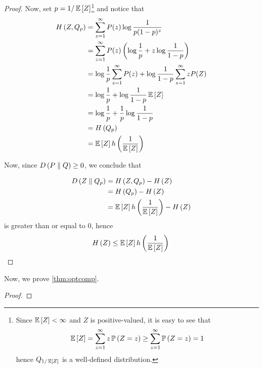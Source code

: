 \begin{proof}
    Now, set $p = \sfrac{1}{\expectation{Z}}$\footnote{
        Since $\expectation{Z} < \infty$ and $Z$ is positive-valued, it is easy to see that
        \[\expectation{Z} = \sum_{z = 1}^{\infty}z\prob{Z = z} \geq \sum_{z = 1}^{\infty}\prob{Z = z} = 1\]
        hence $Q_{\sfrac{1}{\expectation{Z}}}$ is a well-defined distribution.} and
    notice that
    \begin{align*}\entropy{Z, Q_p}
         & = \sum_{z=1}^{\infty}P(z)\log\frac{1}{p(1-p)^z}                                            \\
         & = \sum_{z=1}^{\infty}P(z)\left(\log\frac{1}{p} + z\log\frac{1}{1 - p}\right)               \\
         & = \log\frac{1}{p}\sum_{z = 1}^{\infty}P(z) + \log\frac{1}{1 - p}\sum_{z = 1}^{\infty}zP(Z) \\
         & = \log\frac{1}{p} + \log\frac{1}{1 - p}\expectation{Z}                                     \\
         & = \log\frac{1}{p} + \frac{1}{p}\log\frac{1}{1 - p}                                         \\
         & = \entropy{Q_p}                                                                            \\
         & = \expectation{Z}\binentropy{\frac{1}{\expectation{Z}}}
    \end{align*}

    Now, since $D\left(P \parallel Q\right) \geq 0$, we conclude that

    \begin{align*}\relentropy{Z}{Q_p}
         & = \entropy{Z, Q_p} - \entropy{Z}                                      \\
         & = \entropy{Q_p} - \entropy{Z}                                         \\
         & = \expectation{Z}\binentropy{\frac{1}{\expectation{Z}}} - \entropy{Z}
    \end{align*}
    is greater than or equal to 0, hence
    \[\entropy{Z} \leq \expectation{Z}\binentropy{\frac{1}{\expectation{Z}}}\qedhere\]
\end{proof}

Now, we prove \cref{thm:optcomp}.

\begin{proof}

\end{proof}